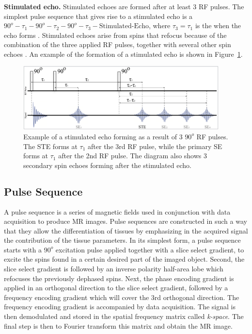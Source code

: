 \hfill

\textbf{Stimulated echo.} Stimulated echoes are formed after at least 3 RF pulses.
The simplest pulse sequence that gives rise to a stimulated echo is a $90^o - \tau_1 - 90^o - \tau_2 - 90^o - \tau_3 - \text{Stimulated-Echo}$, where $\tau_3 = \tau_1$ is the when the echo forms \cite{Frahm1985}.
Stimulated echoes arise from spins that refocus because of the combination of the three applied RF pulses, together with several other spin echoes \cite{Burstein1996}.
An example of the formation of a stimulated echo is shown in Figure~\ref{fig:stimulatedecho}.

\begin{figure}[ht]
    \centering
    \includegraphics[width=0.95\textwidth,keepaspectratio]{images/mri/stimulatedecho}
    \caption{Example of a stimulated echo forming as a result of 3 $90^o$ RF pulses. The STE forms at $\tau_1$ after the 3rd RF pulse, while the primary SE forms at $\tau_1$ after the 2nd RF pulse. The diagram also shows 3 secondary spin echoes forming after the stimulated echo.}
    \label{fig:stimulatedecho}
\end{figure}

\hfill

\subsection{Pulse Sequence}

A pulse sequence is a series of magnetic fields used in conjunction with data acquisition to produce MR images.
Pulse sequences are constructed in such a way that they allow the differentiation of tissues by emphasizing in the acquired signal the contribution of the tissue parameters.
In its simplest form, a pulse sequence starts with a $90^o$ excitation pulse applied together with a slice select gradient, to excite the spins found in a certain desired part of the imaged object.
Second, the slice select gradient is followed by an inverse polarity half-area lobe which refocuses the previously dephased spins.
Next, the phase encoding gradient is applied in an orthogonal direction to the slice select gradient, followed by a frequency encoding gradient which will cover the 3rd orthogonal direction.
The frequency encoding gradient is accompanied by data acquisition.
The signal is then demodulated and stored in the spatial frequency matrix called \textit{k-space}.
The final step is then to Fourier transform this matrix and obtain the MR image.

